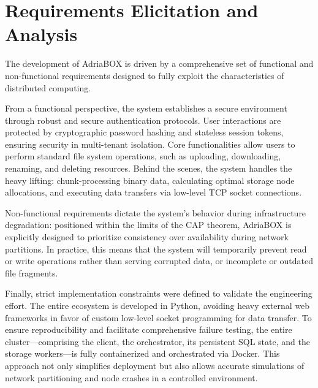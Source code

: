 \documentclass[11pt, a4paper]{article}
\begin{document}
\section{Requirements Elicitation and Analysis}
The development of AdriaBOX is driven by a comprehensive set of functional and non-functional requirements designed to fully exploit the characteristics of distributed computing. 

From a functional perspective, the system establishes a secure environment through robust and secure authentication protocols. User interactions are protected by cryptographic password hashing and stateless session tokens, ensuring security in multi-tenant isolation. Core functionalities allow users to perform standard file system operations, such as uploading, downloading, renaming, and deleting resources. Behind the scenes, the system handles the heavy lifting: chunk-processing binary data, calculating optimal storage node allocations, and executing data transfers via low-level TCP socket connections.

Non-functional requirements dictate the system's behavior during infrastructure degradation: positioned within the limits of the CAP theorem, AdriaBOX is explicitly designed to prioritize consistency over availability during network partitions. In practice, this means that the system will temporarily prevent read or write operations rather than serving corrupted data, or incomplete or outdated file fragments.

Finally, strict implementation constraints were defined to validate the engineering effort. The entire ecosystem is developed in Python, avoiding heavy external web frameworks in favor of custom low-level socket programming for data transfer. To ensure reproducibility and facilitate comprehensive failure testing, the entire cluster—comprising the client, the orchestrator, its persistent SQL state, and the storage workers—is fully containerized and orchestrated via Docker. This approach not only simplifies deployment but also allows accurate simulations of network partitioning and node crashes in a controlled environment.
\end{document}
